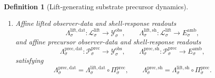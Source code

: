 \documentclass[11pt]{article}
\newcommand{\DataSpace}[1]{\mathcal Y_{#1}^{\mathrm{obs}}}
\newcommand{\AmbientTarget}[1]{E_{#1}^{\mathrm{amb}}}
\newcommand{\SubBody}[1]{\mathcal B_{#1}^{\mathrm{sub}}}
\newcommand{\LiftSpace}[1]{\mathcal L_{#1}^{\mathrm{lift}}}
\newcommand{\LiftBody}[1]{\mathcal B_{#1}^{\mathrm{lift}}}
\newcommand{\LiftProj}[1]{\Pi_{#1}^{\mathrm{lift}}}
\newcommand{\LiftSelect}[1]{\mathfrak s_{#1}^{\mathrm{lift}}}
\newcommand{\LiftFunctional}[1]{\mathscr V_{#1}^{\mathrm{lift}}}
\newcommand{\LiftData}[1]{\Lambda_{#1}^{\mathrm{lift,dat}}}
\newcommand{\LiftShellMap}[1]{\Lambda_{#1}^{\mathrm{lift,sh}}}
\newcommand{\PrecSpace}[1]{\mathcal P_{#1}^{\mathrm{prec}}}
\newcommand{\PrecBody}[1]{\mathcal B_{#1}^{\mathrm{prec}}}
\newcommand{\PrecProj}[1]{\Pi_{#1}^{\mathrm{prec}}}
\newcommand{\PrecLiftMin}[1]{\mathfrak f_{#1}^{\mathrm{prec}}}
\newcommand{\PrecSubMin}[1]{\mathfrak m_{#1}^{\mathrm{prec}}}
\newcommand{\PrecFunctional}[1]{\mathscr W_{#1}^{\mathrm{prec}}}
\newcommand{\PrecData}[1]{\Lambda_{#1}^{\mathrm{prec,dat}}}
\newcommand{\PrecShellMap}[1]{\Lambda_{#1}^{\mathrm{prec,sh}}}
\newcommand{\PrecShellSet}[1]{\mathcal Z_{#1}^{\mathrm{prec}}}
\newtheorem{definition}{Definition}
\begin{document}
\begin{definition}[Lift-generating substrate precursor dynamics]
\begin{enumerate}
\begin{equation}
    =
    \PrecFunctional{\sigma}\bigl(\PrecLiftMin{\sigma}(\ell)\bigr).
    \label{eq:inducedliftfunctional}
    \end{equation}
    Assume that, for each \(\ell\in\LiftBody{\sigma}\), \(\PrecLiftMin{\sigma}(\ell)\) is the unique minimizer of \(\PrecFunctional{\sigma}\) on the fiber
    \[
    \bigl(\PrecProj{\sigma}\bigr)^{-1}(\ell)\cap\PrecBody{\sigma},
    \]
    and, for each \(m\in\SubBody{\sigma}\), \(\PrecSubMin{\sigma}(m)\) is the unique minimizer of \(\PrecFunctional{\sigma}\) on the composite fiber
    \[
    \bigl(\LiftProj{\sigma}\circ\PrecProj{\sigma}\bigr)^{-1}(m)\cap\PrecBody{\sigma}.
    \]
    Assume that \(\LiftSelect{\sigma}(m)\) is therefore the unique minimizer of \(\LiftFunctional{\sigma}\) on
    \[
    \bigl(\LiftProj{\sigma}\bigr)^{-1}(m)\cap\LiftBody{\sigma},
    \]
    and that there exists \(\mu_{\sigma}^{\mathrm{fib}}>0\) such that
    \begin{equation}
    \LiftFunctional{\sigma}(\ell)
    \ge
    \LiftFunctional{\sigma}\bigl(\LiftSelect{\sigma}(m)\bigr)
    +
    \mu_{\sigma}^{\mathrm{fib}}\,
    \operatorname{dist}\bigl(\ell,\LiftSelect{\sigma}(m)\bigr)^{2}
    \label{eq:precfibergap}
    \end{equation}
    for every \(m\in\SubBody{\sigma}\) and every \(\ell\in\bigl(\LiftProj{\sigma}\bigr)^{-1}(m)\cap\LiftBody{\sigma}\). Assume there exists \(\mu_{\sigma}^{\mathrm{sub}}>0\) such that
    \begin{equation}
    \LiftFunctional{\sigma}\bigl(\LiftSelect{\sigma}(m)\bigr)
    \ge
    \mu_{\sigma}^{\mathrm{sub}}\,
    \operatorname{dist}\bigl(m,\LiftProj{\sigma}(\PrecProj{\sigma}(\PrecShellSet{\sigma}))\bigr)^{2}
    \qquad
    \text{for all }m\in\SubBody{\sigma}.
    \label{eq:precprojectedgap}
    \end{equation}
    \item Affine lifted observer-data and shell-response readouts
    \[
    \LiftData{\sigma}:\LiftSpace{\sigma}\to\DataSpace{\sigma},
    \qquad
    \LiftShellMap{\sigma}:\LiftSpace{\sigma}\to\AmbientTarget{\sigma},
    \]
    and affine precursor observer-data and shell-response readouts
    \[
    \PrecData{\sigma}:\PrecSpace{\sigma}\to\DataSpace{\sigma},
    \qquad
    \PrecShellMap{\sigma}:\PrecSpace{\sigma}\to\AmbientTarget{\sigma},
    \]
    satisfying
    \begin{equation}
    \PrecData{\sigma}
    =
    \LiftData{\sigma}\circ\PrecProj{\sigma},
    \qquad
    \PrecShellMap{\sigma}
    =
    \LiftShellMap{\sigma}\circ\PrecProj{\sigma}.
    \label{eq:precfactor}

\end{equation}
\end{enumerate}
\end{definition}
\end{document}
